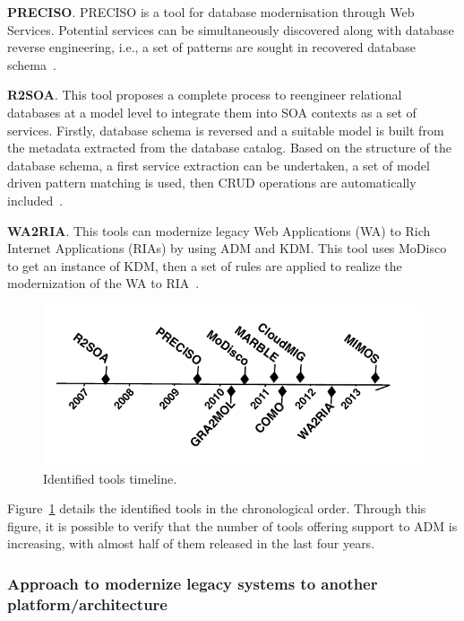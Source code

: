 \textbf{PRECISO}. PRECISO is a tool for database modernisation through Web Services. Potential services can be simultaneously discovered along with database reverse engineering, i.e., a set of patterns are sought in recovered database schema~\cite{delCastillo:2009:PRP:1529282.1529753}.

\textbf{R2SOA}. This tool proposes a complete process to reengineer relational databases at a model level to integrate them into SOA contexts as a set of services. Firstly, database schema is reversed and a suitable model is built from the metadata extracted from the database catalog. Based on the structure of the database schema, a first service extraction can be undertaken, a set of model driven pattern matching is used, then CRUD operations are automatically included~\cite{Guzman:2007:AAR:1339262.1339532}.

\textbf{WA2RIA}. This tools can modernize legacy Web Applications (WA) to Rich Internet Applications (RIAs) by using ADM and KDM. This tool uses MoDisco to get an instance of KDM, then a set of rules are applied to realize the modernization of the WA to RIA~\cite{Rodriguez-Echeverria:2011:MLW:2186508.2186536}.


\begin{figure}[!h]
 \centering
   \includegraphics[scale=0.8]{figuras/timeLineTools}
 \caption{Identified tools timeline.}
 \label{fig:time_line_tools}
\end{figure} 

Figure~\ref{fig:time_line_tools} details the identified tools in the chronological order. Through this figure, it is possible to verify that the number of tools offering support to ADM is increasing, with almost half of them released in the last four years.

\subsubsection{Approach to modernize legacy systems to another platform/architecture} %
\label{ssub:approach}


